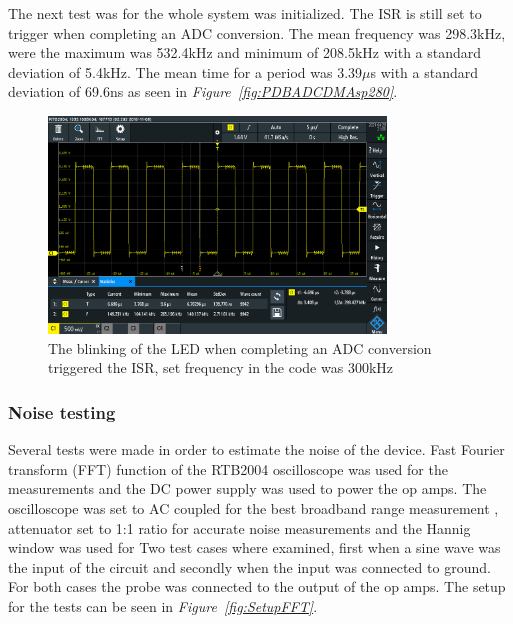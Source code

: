 The next test was for the whole system was initialized.
The ISR is still set to trigger when completing an ADC conversion.
The mean frequency was 298.3kHz, were the maximum was 532.4kHz and minimum of 208.5kHz with a standard deviation of 5.4kHz. 
The mean time for a period was 3.39$\mu$s with a standard deviation of 69.6ns as seen in \textit{Figure~\ref{fig:PDBADCDMAsp280}}.

\begin{figure}[h]
    \centering
    \includegraphics[width=0.8\textwidth]{graphics/ALLT300k.PNG}
    \caption{The blinking of the LED when completing an ADC conversion triggered the ISR, set frequency in the code was 300kHz}
    \label{fig:PDBADCDMAsp300}
\end{figure}


\clearpage




\subsubsection{Noise testing}


Several tests were made in order to estimate the noise of the device.
Fast Fourier transform (FFT) function of the RTB2004 oscilloscope was used for the measurements and the DC power supply was used to power the op amps.
The oscilloscope was set to AC coupled for the best broadband range measurement%
, attenuator set to 1:1 ratio %
for accurate noise measurements and the Hannig window was used for 
Two test cases where examined, first when a sine wave was the input of the circuit and secondly when the input was connected to ground.
For both cases the probe was connected to the output of the op amps.
The setup for the tests can be seen in \textit{Figure~\ref{fig:SetupFFT}}.

